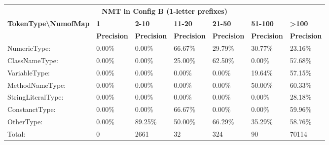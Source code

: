 \begin{table*}[]
\small
\begin{tabular}{|l|l|l|l|l|l|l|}
\hline
\multicolumn{7}{|c|}{\textbf{NMT in Config B (1-letter prefixes)}}                                                                                                              \\ \hline
\textbf{TokenType\textbackslash{}NumofMap} & \textbf{1}         & \textbf{2-10}      & \textbf{11-20}     & \textbf{21-50}     & \textbf{51-100}    & \textbf{\textgreater 100} \\ \hline
                                           & \textbf{Precision} & \textbf{Precision} & \textbf{Precision} & \textbf{Precision} & \textbf{Precision} & \textbf{Precision}        \\ \hline
NumericType:                               & 0.00\%             & 0.00\%             & 66.67\%            & 29.79\%            & 30.77\%            & 23.16\%                   \\ \hline
ClassNameType:                             & 0.00\%             & 0.00\%             & 25.00\%            & 62.50\%            & 0.00\%             & 57.68\%                   \\ \hline
VariableType:                              & 0.00\%             & 0.00\%             & 0.00\%             & 0.00\%             & 19.64\%            & 57.15\%                   \\ \hline
MethodNameType:                            & 0.00\%             & 0.00\%             & 0.00\%             & 0.00\%             & 50.00\%            & 60.33\%                   \\ \hline
StringLiteralType:                         & 0.00\%             & 0.00\%             & 0.00\%             & 0.00\%             & 0.00\%             & 28.18\%                   \\ \hline
ConstanctType:                             & 0.00\%             & 0.00\%             & 66.67\%            & 0.00\%             & 0.00\%             & 59.96\%                   \\ \hline
OtherType:                                 & 0.00\%             & 89.25\%            & 50.00\%            & 66.29\%            & 35.29\%            & 58.76\%                   \\ \hline
Total:                                     & 0                  & 2661               & 32                 & 324                & 90                 & 70114                     \\ \hline

\end{tabular}
\end{table*}
